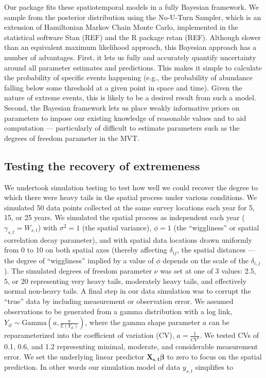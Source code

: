 \documentclass[12pt,english]{article}
\begin{document}
\begin{spacing}{1.25}
Our package fits these spatiotemporal models in a fully Bayesian framework. We
sample from the posterior distribution using the No-U-Turn Sampler, which is an
extension of Hamiltonian Markov Chain Monte Carlo, implemented in the
statistical software Stan (REF) and the R package rstan (REF). Although slower
than an equivalent maximum likelihood approach, this Bayesian approach has a
number of advantages. First, it lets us fully and accurately quantify
uncertainty around all parameter estimates and predictions. This makes it
simple to calculate the probability of specific events happening (e.g., the
probability of abundance falling below some threshold at a given point in space
and time). Given the nature of extreme events, this is likely to be a desired
result from such a model. Second, the Bayesian framework lets us place weakly
informative priors on parameters to impose our existing knowledge of reasonable
values and to aid computation --- particularly of difficult to estimate
parameters such as the degrees of freedom parameter in the MVT.

\subsection{Testing the recovery of extremeness}

We undertook simulation testing to test how well we could recover the degree to
which there were heavy tails in the spatial process under various conditions.
We simulated 50 data points collected at the same survey locations each year
for 5, 15, or 25 years. We simulated the spatial process as independent each
year ($\gamma_{s,t} = W_{s,t}$) with $\sigma^2 = 1$ (the spatial variance),
$\phi = 1$ (the ``wiggliness'' or spatial correlation decay parameter), and
with spatial data locations drawn uniformly from 0 to 10 on both spatial axes
(thereby affecting $\delta_{ij}$, the spatial distances --- the degree of
``wiggliness'' implied by a value of $\phi$ depends on the scale of the
$\delta_{i,j}$). The simulated degrees of freedom parameter $\nu$ was set at
one of 3 values: 2.5, 5, or 20 representing very heavy tails, moderately heavy
tails, and effectively normal non-heavy tails. A final step in our data
simulation was to corrupt the ``true'' data by including measurement or
observation error. We assumed observations to be generated from a gamma
distribution with a log link, $Y_{it}\sim \mathrm{Gamma}\left(a,\frac
  {a}{\mathbb{E}(Y_{it})} \right)$, where the gamma shape parameter $a$ can be
reparameterized into the coefficient of variation (CV), $a=\frac{1}{CV^2}$. We
tested CVs of 0.1, 0.6, and 1.2 representing minimal, moderate, and
considerable measurement error. We set the underlying linear predictor
$\bm{X_{s,t}} \bm{\beta}$ to zero to focus on the spatial prediction. In other
words our simulation model of data $y_{s,t}$ simplifies to


\end{spacing}
\end{document}
